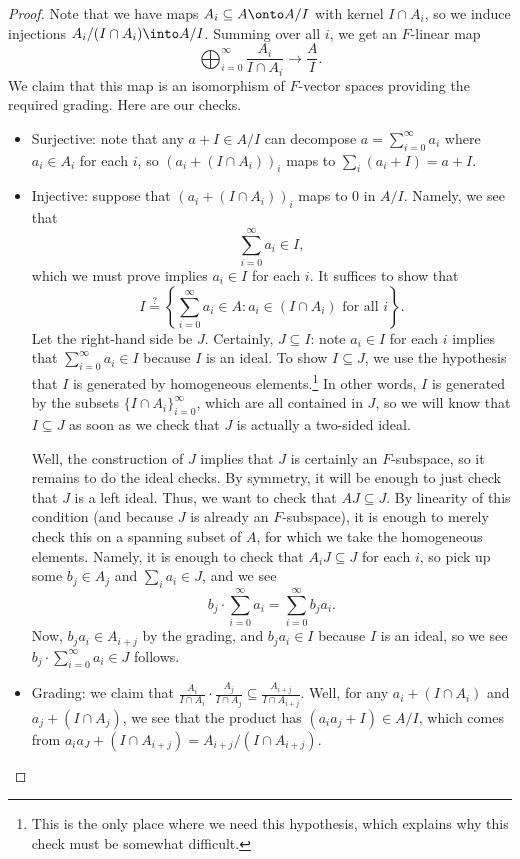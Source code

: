 \documentclass[../notes.tex]{subfiles}
\begin{document}
\begin{proof}
	Note that we have maps $A_i\subseteq A\onto A/I$ with kernel $I\cap A_i$, so we induce injections $A_i/(I\cap A_i)\into A/I$. Summing over all $i$, we get an $F$-linear map
	\[\bigoplus_{i=0}^\infty\frac{A_i}{I\cap A_i}\to\frac AI.\]
	We claim that this map is an isomorphism of $F$-vector spaces providing the required grading. Here are our checks.
	\begin{itemize}
		\item Surjective: note that any $a+I\in A/I$ can decompose $a=\sum_{i=0}^\infty a_i$ where $a_i\in A_i$ for each $i$, so $(a_i+(I\cap A_i))_i$ maps to $\sum_i(a_i+I)=a+I$.

		\item Injective: suppose that $(a_i+(I\cap A_i))_i$ maps to $0$ in $A/I$. Namely, we see that
		\[\sum_{i=0}^\infty a_i\in I,\]
		which we must prove implies $a_i\in I$ for each $i$. It suffices to show that
		\[I\stackrel?=\left\{\sum_{i=0}^\infty a_i\in A:a_i\in(I\cap A_i)\text{ for all }i\right\}.\]
		Let the right-hand side be $J$. Certainly, $J\subseteq I$: note $a_i\in I$ for each $i$ implies that $\sum_{i=0}^\infty a_i\in I$ because $I$ is an ideal. To show $I\subseteq J$, we use the hypothesis that $I$ is generated by homogeneous elements.\footnote{This is the only place where we need this hypothesis, which explains why this check must be somewhat difficult.} In other words, $I$ is generated by the subsets $\{I\cap A_i\}_{i=0}^\infty$, which are all contained in $J$, so we will know that $I\subseteq J$ as soon as we check that $J$ is actually a two-sided ideal.
		
		Well, the construction of $J$ implies that $J$ is certainly an $F$-subspace, so it remains to do the ideal checks. By symmetry, it will be enough to just check that $J$ is a left ideal. Thus, we want to check that $AJ\subseteq J$. By linearity of this condition (and because $J$ is already an $F$-subspace), it is enough to merely check this on a spanning subset of $A$, for which we take the homogeneous elements. Namely, it is enough to check that $A_iJ\subseteq J$ for each $i$, so pick up some $b_j\in A_j$ and $\sum_ia_i\in J$, and we see
		\[b_j\cdot\sum_{i=0}^\infty a_i=\sum_{i=0}^\infty b_ja_i.\]
		Now, $b_ja_i\in A_{i+j}$ by the grading, and $b_ja_i\in I$ because $I$ is an ideal, so we see $b_j\cdot\sum_{i=0}^\infty a_i\in J$ follows.

		\item Grading: we claim that $\frac{A_i}{I\cap A_i}\cdot\frac{A_j}{I\cap A_j}\subseteq\frac{A_{i+j}}{I\cap A_{i+j}}$. Well, for any $a_i+(I\cap A_i)$ and $a_j+(I\cap A_j)$, we see that the product has $(a_ia_j+I)\in A/I$, which comes from $a_ia_J+(I\cap A_{i+j})=A_{i+j}/(I\cap A_{i+j})$.
		\qedhere
	\end{itemize}
\end{proof}
\end{document}
